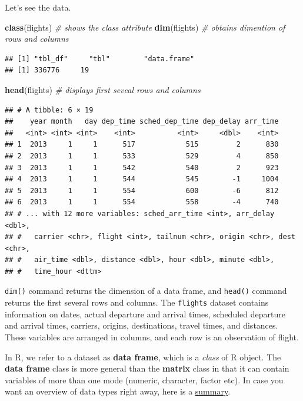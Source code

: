 \documentclass[]{book}
\newenvironment{Shaded}{\begin{snugshade}}{\end{snugshade}}
\newcommand{\KeywordTok}[1]{\textcolor[rgb]{0.13,0.29,0.53}{\textbf{{#1}}}}
\newcommand{\CommentTok}[1]{\textcolor[rgb]{0.56,0.35,0.01}{\textit{{#1}}}}
\newcommand{\NormalTok}[1]{{#1}}
\theoremstyle{definition}
\theoremstyle{definition}
\theoremstyle{remark}
\begin{document}
Let's see the data.

\begin{Shaded}
\begin{Highlighting}[]
\KeywordTok{class}\NormalTok{(flights) }\CommentTok{# shows the class attribute}
\KeywordTok{dim}\NormalTok{(flights)   }\CommentTok{# obtains dimention of rows and columns }
\end{Highlighting}
\end{Shaded}

\begin{verbatim}
## [1] "tbl_df"     "tbl"        "data.frame"
## [1] 336776     19
\end{verbatim}

\begin{Shaded}
\begin{Highlighting}[]
\KeywordTok{head}\NormalTok{(flights)  }\CommentTok{# displays first seveal rows and columns }
\end{Highlighting}
\end{Shaded}

\begin{verbatim}
## # A tibble: 6 × 19
##    year month   day dep_time sched_dep_time dep_delay arr_time
##   <int> <int> <int>    <int>          <int>     <dbl>    <int>
## 1  2013     1     1      517            515         2      830
## 2  2013     1     1      533            529         4      850
## 3  2013     1     1      542            540         2      923
## 4  2013     1     1      544            545        -1     1004
## 5  2013     1     1      554            600        -6      812
## 6  2013     1     1      554            558        -4      740
## # ... with 12 more variables: sched_arr_time <int>, arr_delay <dbl>,
## #   carrier <chr>, flight <int>, tailnum <chr>, origin <chr>, dest <chr>,
## #   air_time <dbl>, distance <dbl>, hour <dbl>, minute <dbl>,
## #   time_hour <dttm>
\end{verbatim}

\texttt{dim()} command returns the dimension of a data frame, and
\texttt{head()} command returns the first several rows and columns. The
\texttt{flights} dataset contains information on dates, actual departure
and arrival times, scheduled departure and arrival times, carriers,
origins, destinations, travel times, and distances. These variables are
arranged in columns, and each row is an observation of flight.

In R, we refer to a dataset as \textbf{data frame}, which is a
\emph{class} of R object. The \textbf{data frame} class is more general
than the \textbf{matrix} class in that it can contain variables of more
than one mode (numeric, character, factor etc). In case you want an
overview of data types right away, here is a
\href{http://www.statmethods.net/input/datatypes.html}{summary}.
\end{document}
